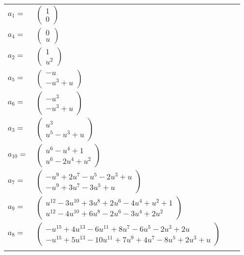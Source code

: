 \documentclass[1p]{elsarticle_modified}
\theoremstyle{definition}
\begin{document}
\begin{tabular}{m{7pt} m{180pt} m{7pt} m{180pt} }
\flushright $a_{1}=$&$\begin{pmatrix}1\\0\end{pmatrix}$ \\
\flushright $a_{4}=$&$\begin{pmatrix}0\\u\end{pmatrix}$ \\
\flushright $a_{2}=$&$\begin{pmatrix}1\\u^2\end{pmatrix}$ \\
\flushright $a_{5}=$&$\begin{pmatrix}- u\\- u^3+u\end{pmatrix}$ \\
\flushright $a_{6}=$&$\begin{pmatrix}- u^3\\- u^3+u\end{pmatrix}$ \\
\flushright $a_{3}=$&$\begin{pmatrix}u^3\\u^5- u^3+u\end{pmatrix}$ \\
\flushright $a_{10}=$&$\begin{pmatrix}u^6- u^4+1\\u^6-2 u^4+u^2\end{pmatrix}$ \\
\flushright $a_{7}=$&$\begin{pmatrix}- u^9+2 u^7- u^5-2 u^3+u\\- u^9+3 u^7-3 u^5+u\end{pmatrix}$ \\
\flushright $a_{9}=$&$\begin{pmatrix}u^{12}-3 u^{10}+3 u^8+2 u^6-4 u^4+u^2+1\\u^{12}-4 u^{10}+6 u^8-2 u^6-3 u^4+2 u^2\end{pmatrix}$ \\
\flushright $a_{8}=$&$\begin{pmatrix}- u^{15}+4 u^{13}-6 u^{11}+8 u^7-6 u^5-2 u^3+2 u\\- u^{15}+5 u^{13}-10 u^{11}+7 u^9+4 u^7-8 u^5+2 u^3+u\end{pmatrix}$\\&\end{tabular}
\end{document}
